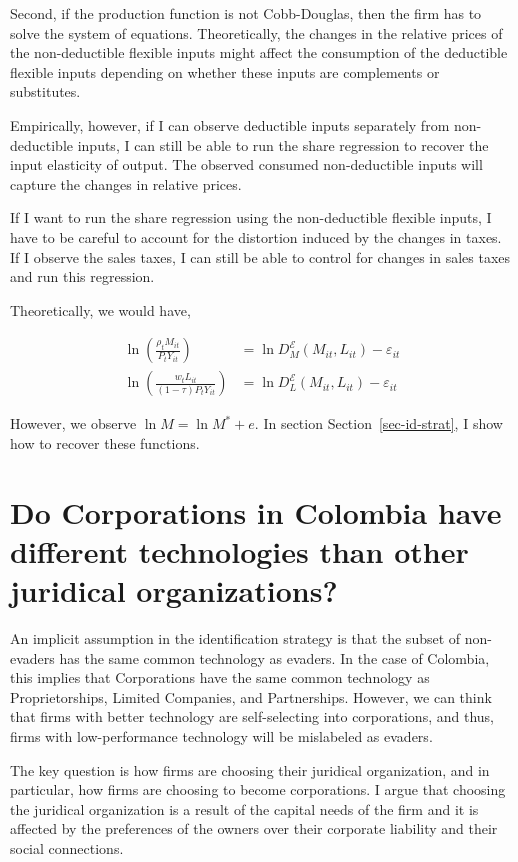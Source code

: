 \documentclass[
  12pt]{article}
\theoremstyle{definition}
\theoremstyle{remark}
\begin{document}
Second, if the production function is not Cobb-Douglas, then the firm
has to solve the system of equations. Theoretically, the changes in the
relative prices of the non-deductible flexible inputs might affect the
consumption of the deductible flexible inputs depending on whether these
inputs are complements or substitutes.

Empirically, however, if I can observe deductible inputs separately from
non-deductible inputs, I can still be able to run the share regression
to recover the input elasticity of output. The observed consumed
non-deductible inputs will capture the changes in relative prices.

If I want to run the share regression using the non-deductible flexible
inputs, I have to be careful to account for the distortion induced by
the changes in taxes. If I observe the sales taxes, I can still be able
to control for changes in sales taxes and run this regression.

Theoretically, we would have,

\[
\begin{aligned}
    \ln\left(\frac{\rho_{t}M_{it}}{P_tY_{it}}\right)&=\ln D^{\mathcal{E}}_M(M_{it}, L_{it})-\varepsilon_{it} \\
    \ln\left(\frac{w_{t}L_{it}}{(1-\tau)P_tY_{it}}\right)&=\ln D^{\mathcal{E}}_L(M_{it}, L_{it})-\varepsilon_{it}
\end{aligned}
\]

However, we observe \(\ln M=\ln M^*+e\). In section
Section~\ref{sec-id-strat}, I show how to recover these functions.

\section{Do Corporations in Colombia have different technologies than
other juridical
organizations?}\label{do-corporations-in-colombia-have-different-technologies-than-other-juridical-organizations}

An implicit assumption in the identification strategy is that the subset
of non-evaders has the same common technology as evaders. In the case of
Colombia, this implies that Corporations have the same common technology
as Proprietorships, Limited Companies, and Partnerships. However, we can
think that firms with better technology are self-selecting into
corporations, and thus, firms with low-performance technology will be
mislabeled as evaders.

The key question is how firms are choosing their juridical organization,
and in particular, how firms are choosing to become corporations. I
argue that choosing the juridical organization is a result of the
capital needs of the firm and it is affected by the preferences of the
owners over their corporate liability and their social connections.
\end{document}
